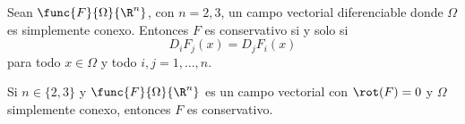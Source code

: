 \documentclass[a4,11pt]{aleph-notas}
\begin{document}
\begin{prop}
    Sean $\func{F}{\Omega}{\R^n}$, con $n=2,3$, un campo vectorial diferenciable donde $\Omega$ es simplemente conexo. Entonces $F$ es conservativo si y solo si
    \[
        D_i F_j(x) = D_j F_i(x)
    \]
    para todo $x\in \Omega$ y todo $i,j=1,\ldots,n$.
\end{prop}

\begin{prop}
    Si $n\in\{2,3\}$ y $\func{F}{\Omega}{\R^n}$ es un campo vectorial con $\rot(F)=0$ y $\Omega$ simplemente conexo, entonces $F$ es conservativo.
\end{prop}
\end{document}
